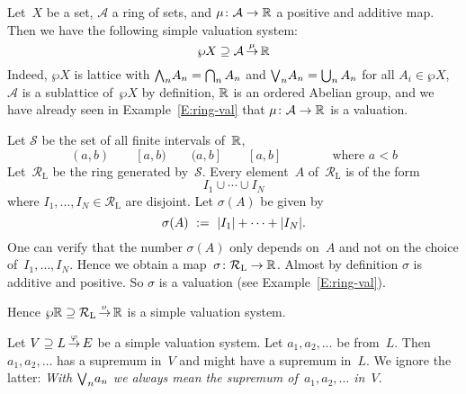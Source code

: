 \documentclass[main.tex]{subfiles}
\begin{document}
\begin{ex}
\label{E:ring-system}
Let~$X$ be a set, 
$\mathcal{A}$ a ring of sets,
and $\mu\colon \mathcal{A}\rightarrow \mathbb{R}$
a positive and additive map.
Then we have the following simple valuation system:
\begin{equation*}
\wp X \supseteq \mathcal{A}\,\smash{\stackrel{\mu}{\rightarrow}}\,\mathbb{R}
\end{equation*}
Indeed, $\wp X$ is lattice with 
$\textstyle{\bigwedge}_n A_n = \bigcap_n A_n$
and $\textstyle{\bigvee}_n A_n = \bigcup_n A_n$ for all $A_i \in \wp X$,
$\mathcal{A}$ is a sublattice of~$\wp X$
by definition,
$\mathbb{R}$ is an ordered Abelian group,
and we have already seen in Example~\ref{E:ring-val}
that $\mu\colon \mathcal{A}\rightarrow \mathbb{R}$ is a valuation.
\end{ex}

\begin{ex}
Let $\mathcal{S}$ be the set of all finite intervals of~$\mathbb{R}$,
\begin{equation*}
(a,b)\qquad [a,b)\qquad (a,b]\qquad [a,b]
\qquad\qquad\text{where }a<b
\end{equation*}
Let~$\mathcal{R}_\mathrm{L}$ be the ring generated by~$\mathcal{S}$.
Every element~$A$ of~$\mathcal{R}_\mathrm{L}$ is of the form
\begin{equation*}
I_1 \cup \dotsb \cup I_N
\end{equation*}
where $I_1,\dotsc,I_N\in \mathcal{R}_\mathrm{L}$
are disjoint.
Let $\sigma(A)$ be given by
\begin{equation*}
\sigma(A) \ :=\  |I_1| + \dotsb + |I_N|.
\end{equation*}
One can verify that the number $\sigma(A)$
only depends on~$A$ and not on the choice of~$I_1,\dotsc,I_N$.
Hence we obtain a map~$\sigma\colon \mathcal{R}_\mathrm{L} \rightarrow \mathbb{R}$.
Almost by definition $\sigma$ is additive and positive.
So $\sigma$ is a valuation 
(see Example~\ref{E:ring-val}).

Hence $\wp \mathbb{R} \supseteq \mathcal{R}_\mathrm{L}\,\smash{\stackrel{\sigma}{\rightarrow}}\,\mathbb{R}$
is a simple valuation system.
\end{ex}


\begin{nt}
Let $V \supseteq L\,\smash{\stackrel{\varphi}{\rightarrow}}\,E$ be a simple valuation system.
Let $a_1, a_2, \dotsc$ be from~$L$.
Then $a_1, a_2,\dotsc$ has a supremum
in~$V$ and might have a supremum in~$L$.
We ignore the latter:
\emph{With $\textstyle{\bigvee}_n a_n$
we always mean the supremum of~$a_1, a_2,\dotsc $ in~$V$}.
\end{nt}
\end{document}
